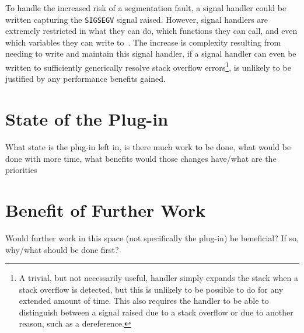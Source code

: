 To handle the increased risk of a segmentation fault, a signal handler could be written capturing the \texttt{SIGSEGV} signal raised. However, signal handlers are extremely restricted in what they can do, which functions they can call, and even which variables they can write to~\cite{signalhandling}. The increase is complexity resulting from needing to write and maintain this signal handler, if a signal handler can even be written to sufficiently generically resolve stack overflow errors\footnote{A trivial, but not necessarily useful, handler simply expands the stack when a stack overflow is detected, but this is unlikely to be possible to do for any extended amount of time. This also requires the handler to be able to distinguish between a signal raised due to a stack overflow or due to another reason, such as a  dereference.}, is unlikely to be justified by any performance benefits gained.

\section{State of the Plug-in}

What state is the plug-in left in, is there much work to be done, what would be done with more time, what benefits would those changes have/what are the priorities

\section{Benefit of Further Work}

Would further work in this space (not specifically the plug-in) be beneficial? If so, why/what should be done first?
